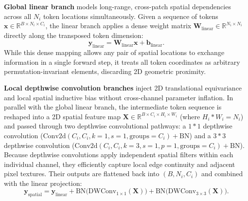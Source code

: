 \textbf{Global linear branch} models long-range, cross-patch spatial dependencies across all $N_i$ token locations simultaneously. Given a sequence of tokens $\mathbf{x} \in \mathbb{R}^{B \times N_i \times C_i}$, the linear branch applies a dense weight matrix $\mathbf{W}_{\text{linear}} \in \mathbb{R}^{N_i \times N_i}$ directly along the transposed token dimension:
\begin{equation}
\mathbf{y}_{\text{linear}} = \mathbf{W}_{\text{linear}} \mathbf{x} + \mathbf{b}_{\text{linear}}.
\end{equation}
While this dense mapping allows any pair of spatial locations to exchange information in a single forward step, it treats all token coordinates as arbitrary permutation-invariant elements, discarding 2D geometric proximity.

\textbf{Local depthwise convolution branches} inject 2D translational equivariance and local spatial inductive bias without cross-channel parameter inflation. In parallel with the global linear branch, the intermediate token sequence is reshaped into a 2D spatial feature map $\mathbf{X} \in \mathbb{R}^{B \times C_i \times H_i \times W_i}$ (where $H_i * W_i = N_i$) and passed through two depthwise convolutional pathways: a $1*1$ depthwise convolution ($\text{Conv2d}(C_i, C_i, k=1, s=1, \text{groups}=C_i) + \text{BN}$) and a $3*3$ depthwise convolution ($\text{Conv2d}(C_i, C_i, k=3, s=1, p=1, \text{groups}=C_i) + \text{BN}$). Because depthwise convolutions apply independent spatial filters within each individual channel, they efficiently capture local edge continuity and adjacent pixel textures. Their outputs are flattened back into $(B, N_i, C_i)$ and combined with the linear projection:
\begin{equation}
\mathbf{y}_{\text{spatial}} = \mathbf{y}_{\text{linear}} + \text{BN}\big(\text{DWConv}_{1\times1}(\mathbf{X})\big) + \text{BN}\big(\text{DWConv}_{3\times3}(\mathbf{X})\big).
\end{equation}

